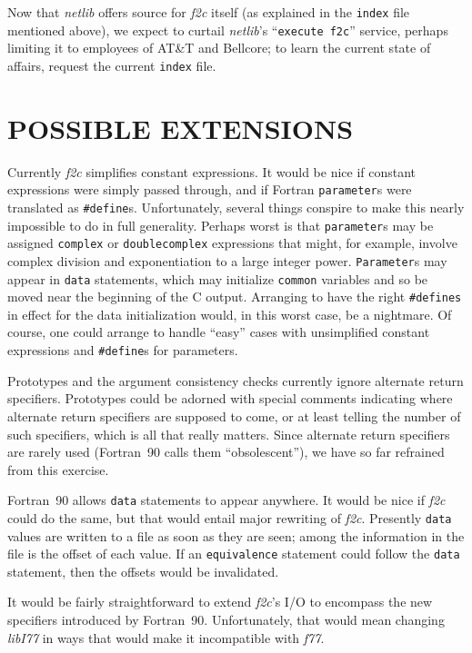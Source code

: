 \documentclass[12pt]{article}
\begin{document}
Now that \emph{netlib} offers source for \emph{f2c} itself (as explained in the \verb|index| file mentioned above), we expect to curtail \emph{netlib}’s ``\texttt{execute f2c}'' service, perhaps limiting it to employees of AT\&T and Bellcore; to learn the current state of affairs, request the current \verb|index| file.

\section{POSSIBLE EXTENSIONS}

Currently \emph{f2c} simplifies constant expressions. It would be nice if constant expressions were simply passed through, and if Fortran \verb|parameter|s were translated as \verb|#define|s. Unfortunately, several things conspire to make this nearly impossible to do in full generality. Perhaps worst is that \verb|parameter|s may be assigned \verb|complex| or \verb|doublecomplex| expressions that might, for example, involve complex division and exponentiation to a large integer power. \verb|Parameter|s may appear in \verb|data| statements, which may initialize \verb|common| variables and so be moved near the beginning of the C output. Arranging to have the right \verb|#defines| in effect for the data initialization would, in this worst case, be a nightmare. Of course, one could arrange to handle ``easy'' cases with unsimplified constant expressions and \verb|#define|s for parameters.

Prototypes and the argument consistency checks currently ignore alternate return specifiers. Prototypes could be adorned with special comments indicating where alternate return specifiers are supposed to come, or at least telling the number of such specifiers, which is all that really matters. Since alternate return specifiers are rarely used (Fortran~90 calls them ``obsolescent''), we have so far refrained from this exercise.

Fortran~90 allows \verb|data| statements to appear anywhere. It would be nice if \emph{f2c} could do the same, but that would entail major rewriting of \emph{f2c}. Presently \verb|data| values are written to a file as soon as they are seen; among the information in the file is the offset of each value. If an \verb|equivalence| statement could follow the \verb|data| statement, then the offsets would be invalidated.

It would be fairly straightforward to extend \emph{f2c}’s I/O to encompass the new specifiers introduced by Fortran~90. Unfortunately, that would mean changing \emph{libI77} in ways that would make it incompatible with \emph{f77}.
\end{document}
